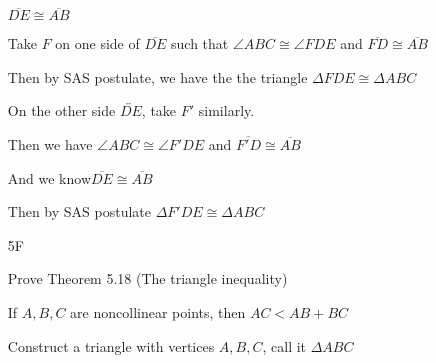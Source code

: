\documentclass[11pt]{article}
\newcommand{\lines}[1]{\overleftrightarrow{#1}}
\newcommand{\segment}[1]{\overline{#1}}
\begin{document}
\begin{itemize}
		$\segment{DE} \cong \segment{AB}$

		Take $F$ on one side of $\segment{DE}$ such that $\angle{ABC} \cong \angle{FDE}$ and $\segment{FD} \cong \segment{AB}$

		Then by SAS postulate, we have the the triangle $\Delta FDE \cong \Delta ABC$

		On the other side $\lines{DE}$, take $F'$ similarly.

		Then we have $\angle{ABC} \cong \angle{F'DE}$ and $\segment{F'D}  \cong \segment{AB}$ 
	
		And we know$\segment{DE} \cong \segment{AB}$

		Then by SAS postulate $\Delta F'DE \cong \Delta ABC$

	\item[5F]

		Prove Theorem 5.18 (The triangle inequality)

		If $A,B,C$ are noncollinear points, then $AC < AB + BC$

		Construct a triangle with vertices $A,B,C$, call it $\Delta ABC$



			
\end{itemize}
\end{document}
